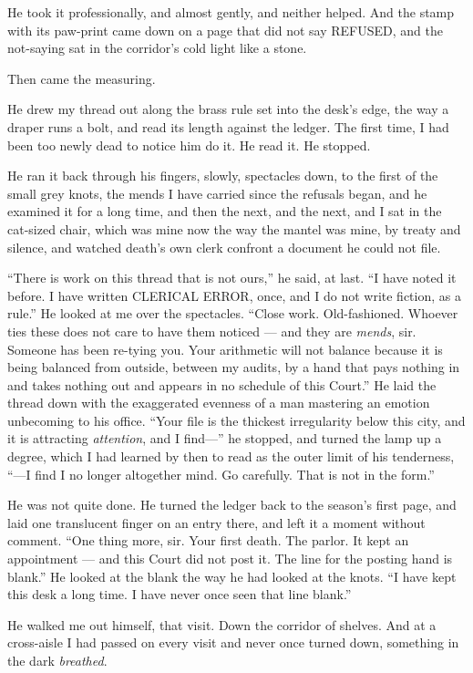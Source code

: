 He took it professionally, and almost gently, and neither helped. And the stamp with its paw-print came down on a page that did not say REFUSED, and the not-saying sat in the corridor's cold light like a stone.

Then came the measuring.

He drew my thread out along the brass rule set into the desk's edge, the way a draper runs a bolt, and read its length against the ledger. The first time, I had been too newly dead to notice him do it. He read it. He stopped.

He ran it back through his fingers, slowly, spectacles down, to the first of the small grey knots, the mends I have carried since the refusals began, and he examined it for a long time, and then the next, and the next, and I sat in the cat-sized chair, which was mine now the way the mantel was mine, by treaty and silence, and watched death's own clerk confront a document he could not file.

``There is work on this thread that is not ours,'' he said, at last. ``I have noted it before. I have written CLERICAL ERROR, once, and I do not write fiction, as a rule.'' He looked at me over the spectacles. ``Close work. Old-fashioned. Whoever ties these does not care to have them noticed --- and they are \emph{mends}, sir. Someone has been re-tying you. Your arithmetic will not balance because it is being balanced from outside, between my audits, by a hand that pays nothing in and takes nothing out and appears in no schedule of this Court.'' He laid the thread down with the exaggerated evenness of a man mastering an emotion unbecoming to his office. ``Your file is the thickest irregularity below this city, and it is attracting \emph{attention}, and I find---'' he stopped, and turned the lamp up a degree, which I had learned by then to read as the outer limit of his tenderness, ``---I find I no longer altogether mind. Go carefully. That is not in the form.''

He was not quite done. He turned the ledger back to the season's first page, and laid one translucent finger on an entry there, and left it a moment without comment. ``One thing more, sir. Your first death. The parlor. It kept an appointment --- and this Court did not post it. The line for the posting hand is blank.'' He looked at the blank the way he had looked at the knots. ``I have kept this desk a long time. I have never once seen that line blank.''

He walked me out himself, that visit. Down the corridor of shelves. And at a cross-aisle I had passed on every visit and never once turned down, something in the dark \emph{breathed}.

